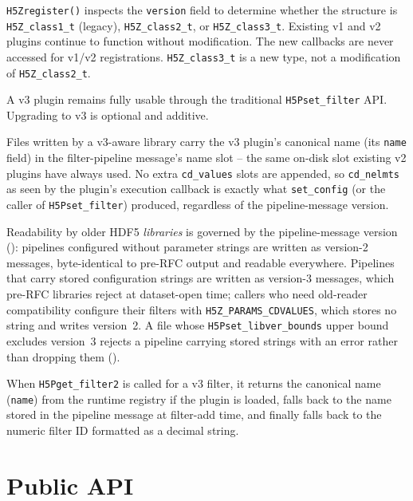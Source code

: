 \documentclass[../RFC-HDFG-2026-001.tex]{subfiles}
\begin{document}
\texttt{H5Zregister()} inspects the \texttt{version} field to determine whether the
structure is \texttt{H5Z\_class1\_t} (legacy), \texttt{H5Z\_class2\_t}, or
\texttt{H5Z\_class3\_t}. Existing v1 and v2 plugins continue to function without
modification. The new callbacks are never accessed for v1/v2 registrations.
\texttt{H5Z\_class3\_t} is a new type, not a modification of \texttt{H5Z\_class2\_t}.

A v3 plugin remains fully usable through the traditional \texttt{H5Pset\_filter} API.
Upgrading to v3 is optional and additive.

Files written by a v3-aware library carry the v3 plugin's canonical
name (its \texttt{name} field) in the filter-pipeline message's name
slot -- the same on-disk slot existing v2 plugins have always used.
No extra \texttt{cd\_values} slots are appended, so \texttt{cd\_nelmts}
as seen by the plugin's execution callback is exactly what
\texttt{set\_config} (or the caller of \texttt{H5Pset\_filter})
produced, regardless of the pipeline-message version.

Readability by older HDF5 \emph{libraries} is governed by the
pipeline-message version (): pipelines
configured without parameter strings are written as version-2 messages,
byte-identical to pre-RFC output and readable everywhere.  Pipelines that
carry stored configuration strings are written as version-3 messages,
which pre-RFC libraries reject at dataset-open time; callers who need
old-reader compatibility configure their filters with
\texttt{H5Z\_PARAMS\_CDVALUES}, which stores no string and writes
version~2.  A file whose \texttt{H5Pset\_libver\_bounds} upper bound
excludes version~3 rejects a pipeline carrying stored strings with an
error rather than dropping them ().

When \texttt{H5Pget\_filter2} is called for a v3 filter, it returns
the canonical name (\texttt{name}) from the runtime registry if the
plugin is loaded, falls back to the name stored in the pipeline
message at filter-add time, and finally falls back to the numeric
filter ID formatted as a decimal string.


\section{Public API}
\label{sec:public-api}
\end{document}
